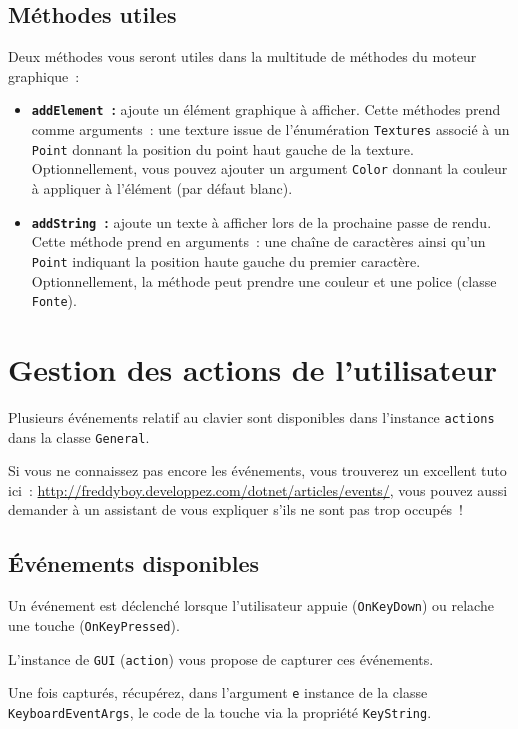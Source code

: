 


\subsection{Méthodes utiles}
\label{ssec:methodutiles}

Deux méthodes vous seront utiles dans la multitude de méthodes du moteur graphique~:

\begin{itemize}
  \item \textbf{\texttt{addElement}~:} ajoute un élément graphique à afficher. Cette méthodes prend comme arguments~: une texture issue de l'énumération \texttt{Textures} associé à un \texttt{Point} donnant la position du point haut gauche de la texture. Optionnellement, vous pouvez ajouter un argument \texttt{Color} donnant la couleur à appliquer à l'élément (par défaut blanc).
    \item \textbf{\texttt{addString}~:} ajoute un texte à afficher lors de la prochaine passe de rendu. Cette méthode prend en arguments~: une chaîne de caractères ainsi qu'un \texttt{Point} indiquant la position haute gauche du premier caractère. Optionnellement, la méthode peut prendre une couleur et une police (classe \texttt{Fonte}).
\end{itemize}


\section{Gestion des actions de l'utilisateur}

Plusieurs événements relatif au clavier sont disponibles dans l'instance \texttt{actions} dans la classe \texttt{General}.

Si vous ne connaissez pas encore les événements, vous trouverez un excellent tuto ici~: \url{http://freddyboy.developpez.com/dotnet/articles/events/}, vous pouvez aussi demander à un assistant de vous expliquer s'ils ne sont pas trop occupés~!

\subsection{Événements disponibles}

Un événement est déclenché lorsque l'utilisateur appuie (\texttt{OnKeyDown}) ou relache une touche (\texttt{OnKeyPressed}).

L'instance de \texttt{GUI} (\texttt{action}) vous propose de capturer ces événements.

Une fois capturés, récupérez, dans l'argument \texttt{e} instance de la classe \texttt{KeyboardEventArgs}, le code de la touche via la propriété \texttt{KeyString}.